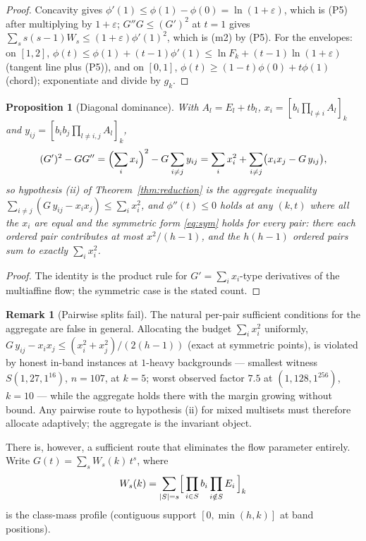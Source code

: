 \documentclass[11pt]{article}
\newtheorem{proposition}[theorem]{Proposition}
\theoremstyle{definition}
\newtheorem{remark}[theorem]{Remark}
\newcommand{\eps}{\varepsilon}
\begin{document}
\begin{proof}
Concavity gives $\phi'(1)\le\phi(1)-\phi(0)=\ln(1+\eps)$, which is
(P5) after multiplying by $1+\eps$; $G''G\le(G')^2$ at $t=1$ gives
$\sum_ss(s-1)W_s\le(1+\eps)\phi'(1)^2$, which is (m2) by (P5).  For
the envelopes: on $[1,2]$, $\phi(t)\le\phi(1)+(t-1)\phi'(1)\le\ln
F_k+(t-1)\ln(1+\eps)$ (tangent line plus (P5)), and on $[0,1]$,
$\phi(t)\ge(1-t)\phi(0)+t\phi(1)$ (chord); exponentiate and divide by
$g_k$.\;
\end{proof}

\begin{proposition}[Diagonal dominance]\label{prop:dd}
With $A_l=E_l+tb_l$, $x_i=[b_i\prod_{l\ne i}A_l]_k$ and
$y_{ij}=[b_ib_j\prod_{l\ne i,j}A_l]_k$,
\[
  (G')^2-GG''=\Bigl(\sum_ix_i\Bigr)^2-G\sum_{i\ne j}y_{ij}
  =\sum_ix_i^2+\sum_{i\ne j}\bigl(x_ix_j-G\,y_{ij}\bigr),
\]
so hypothesis (ii) of Theorem~\ref{thm:reduction} is the aggregate
inequality $\sum_{i\ne j}(G\,y_{ij}-x_ix_j)\le\sum_ix_i^2$, and
$\phi''(t)\le0$ holds at any $(k,t)$ where all the $x_i$ are equal
and the symmetric form \eqref{eq:sym} holds for every pair: there
each ordered pair contributes at most $x^2/(h-1)$, and the
$h(h-1)$ ordered pairs sum to exactly $\sum_ix_i^2$.
\end{proposition}

\begin{proof}
The identity is the product rule for
$G'=\sum_ix_i$-type derivatives of the multiaffine flow; the
symmetric case is the stated count.
\end{proof}

\begin{remark}[Pairwise splits fail]\label{rem:nopairwise}
The natural per-pair sufficient conditions for the aggregate are
false in general.  Allocating the budget $\sum_ix_i^2$ uniformly,
$G\,y_{ij}-x_ix_j\le(x_i^2+x_j^2)/(2(h-1))$ (exact at symmetric
points), is violated by honest in-band instances at $1$-heavy
backgrounds --- smallest witness $S(1,27,1^{16})$, $n=107$, at
$k=5$; worst observed factor $7.5$ at $(1,128,1^{256})$, $k=10$ ---
while the aggregate holds there with the margin growing without
bound.  Any pairwise route to hypothesis (ii) for mixed multisets
must therefore allocate adaptively; the aggregate is the
invariant object.
\end{remark}

There is, however, a sufficient route that eliminates the flow
parameter entirely.  Write $G(t)=\sum_sW_s(k)\,t^s$, where
\[
  W_s(k)=\sum_{|S|=s}\Bigl[\,\prod_{i\in S}b_i\prod_{i\notin S}E_i\,
  \Bigr]_k
\]
is the class-mass profile (contiguous support $[0,\min(h,k)]$ at
band positions).
\end{document}
